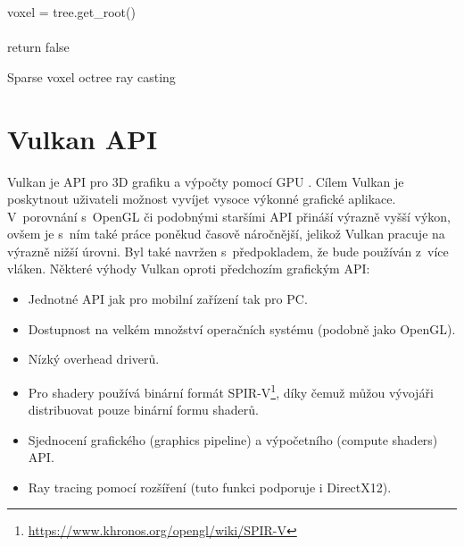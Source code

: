 \begin{center}
	\begin{czechalgorithm}[H] \label{alg:svo}
		voxel = tree.get\_root()\\
		\\
		return false
		\caption{Sparse voxel octree ray casting}
	\end{czechalgorithm}
\end{center}

\section{Vulkan API}
Vulkan je API pro 3D grafiku a výpočty pomocí GPU \cite{vulkan_web}. Cílem Vulkan je poskytnout uživateli možnost vyvíjet vysoce výkonné grafické aplikace. V~porovnání s~OpenGL či podobnými staršími API přináší výrazně vyšší výkon, ovšem je s~ním také práce poněkud časově náročnější, jelikož Vulkan pracuje na výrazně nižší úrovni. Byl také navržen s~předpokladem, že bude používán z~více vláken. Některé výhody Vulkan oproti předchozím grafickým API:

\begin{itemize}
	\item Jednotné API jak pro mobilní zařízení tak pro PC.
	\item Dostupnost na velkém množství operačních systému (podobně jako OpenGL).
	\item Nízký overhead driverů.
	\item Pro shadery používá binární formát SPIR-V\footnote{\url{https://www.khronos.org/opengl/wiki/SPIR-V}}, díky čemuž můžou vývojáři distribuovat pouze binární formu shaderů.
	\item Sjednocení grafického (graphics pipeline) a výpočetního (compute shaders) API.
	\item Ray tracing pomocí rozšíření (tuto funkci podporuje i DirectX12).
\end{itemize}

